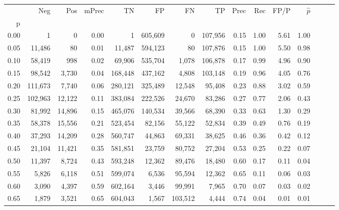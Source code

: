 \begin{tabular}{rrrrrrrrrrrrrrr}
\toprule
{} &      Neg &     Pos & mPrec &       TN &       FP &       FN &       TP &  Prec &   Rec &  FP/P & $\hat{p}$ \\
p    &          &         &       &          &          &          &          &       &       &       &           \\
\midrule
0.00 &        1 &       0 &  0.00 &        1 &  605,609 &        0 &  107,956 &  0.15 &  1.00 &  5.61 &      1.00 \\
0.05 &   11,486 &      80 &  0.01 &   11,487 &  594,123 &       80 &  107,876 &  0.15 &  1.00 &  5.50 &      0.98 \\
0.10 &   58,419 &     998 &  0.02 &   69,906 &  535,704 &    1,078 &  106,878 &  0.17 &  0.99 &  4.96 &      0.90 \\
0.15 &   98,542 &   3,730 &  0.04 &  168,448 &  437,162 &    4,808 &  103,148 &  0.19 &  0.96 &  4.05 &      0.76 \\
0.20 &  111,673 &   7,740 &  0.06 &  280,121 &  325,489 &   12,548 &   95,408 &  0.23 &  0.88 &  3.02 &      0.59 \\
0.25 &  102,963 &  12,122 &  0.11 &  383,084 &  222,526 &   24,670 &   83,286 &  0.27 &  0.77 &  2.06 &      0.43 \\
0.30 &   81,992 &  14,896 &  0.15 &  465,076 &  140,534 &   39,566 &   68,390 &  0.33 &  0.63 &  1.30 &      0.29 \\
0.35 &   58,378 &  15,556 &  0.21 &  523,454 &   82,156 &   55,122 &   52,834 &  0.39 &  0.49 &  0.76 &      0.19 \\
0.40 &   37,293 &  14,209 &  0.28 &  560,747 &   44,863 &   69,331 &   38,625 &  0.46 &  0.36 &  0.42 &      0.12 \\
0.45 &   21,104 &  11,421 &  0.35 &  581,851 &   23,759 &   80,752 &   27,204 &  0.53 &  0.25 &  0.22 &      0.07 \\
0.50 &   11,397 &   8,724 &  0.43 &  593,248 &   12,362 &   89,476 &   18,480 &  0.60 &  0.17 &  0.11 &      0.04 \\
0.55 &    5,826 &   6,118 &  0.51 &  599,074 &    6,536 &   95,594 &   12,362 &  0.65 &  0.11 &  0.06 &      0.03 \\
0.60 &    3,090 &   4,397 &  0.59 &  602,164 &    3,446 &   99,991 &    7,965 &  0.70 &  0.07 &  0.03 &      0.02 \\
0.65 &    1,879 &   3,521 &  0.65 &  604,043 &    1,567 &  103,512 &    4,444 &  0.74 &  0.04 &  0.01 &      0.01 \\

\end{tabular}
